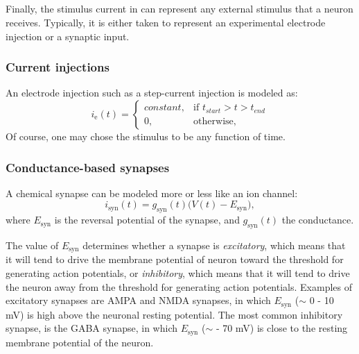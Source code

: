 \subsection{}
\label{sec:Neuron:stim}
Finally, the stimulus current in  can represent any external stimulus that a neuron receives. Typically, it is either taken to represent an experimental electrode injection or a synaptic input. 


\subsubsection{Current injections}
An electrode injection such as a step-current injection is modeled as:
\begin{equation}
i_\text{e}(t)= 
\begin{cases}
    constant, & \text{if } t_{start} > t > t_{end} \\
    0,              & \text{otherwise},
\end{cases}
\label{eq:Neuron:injected}
\end{equation}
Of course, one may chose the stimulus to be any function of time.


\subsubsection{Conductance-based synapses}
A chemical synapse can be modeled  more or less like an ion channel:
\begin{equation}
i_\text{syn}(t) = g_\text{syn}(t) \big(V(t)-E_\text{syn} \big), 
\label{eq:Neuron:chemicalsynapse}
\end{equation}
where $E_\text{syn}$ is the reversal potential of the synapse, and $g_\text{syn}(t)$ the conductance. 

The value of $E_\text{syn}$ determines whether a synapse is \textit{excitatory}, which means that it will tend to drive the  membrane potential of neuron toward the threshold for generating action potentials, or \textit{inhibitory}, which means that it will tend to drive the neuron away from the threshold for generating action potentials. Examples of excitatory synapses are AMPA and NMDA synapses, in which $E_\text{syn}$ ($\sim$ 0 - 10 mV) is high above the neuronal resting potential. The most common inhibitory synapse, is the GABA synapse, in which $E_\text{syn}$ ($\sim$ - 70 mV) is close to the resting membrane potential of the neuron.


